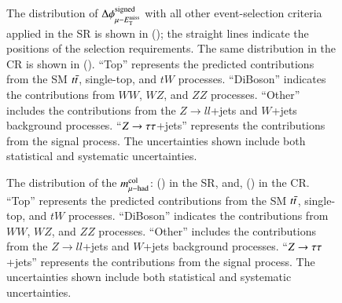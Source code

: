         \begin{figure}[htbp]
            \centering
            \caption{
                The distribution of $\Delta \phi_{\mu\mathrm{-}E_{\text{T}}^{\text{miss}}}^\mathrm{signed}$ with all other event-selection criteria 
                applied in the SR is shown in (\protect{}); 
                the straight lines indicate the positions of the selection requirements.
                The same distribution in the CR is shown in (\protect{}). 
                ``Top'' represents the predicted contributions from the SM $t\bar{t}$, single-top, and $tW$ processes. 
                ``DiBoson'' indicates the contributions from $WW$, $WZ$, and $ZZ$ processes. 
                ``Other'' includes the contributions from the $Z\rightarrow ll$+jets and $W$+jets background processes. 
                ``$Z \rightarrow \tau\tau$+jets'' represents the contributions from the signal process.
                The uncertainties shown include both statistical and systematic uncertainties.
            }
            \label{fig:murm:s_dphi}
        \end{figure}

        \begin{figure}[htbp]
            \centering
            \caption{
                The distribution of the $m_{\mu\mathrm{-}\mathrm{had}}^\mathrm{col}$: (\protect{}) in the SR, and,
                (\protect{}) in the CR. 
                ``Top'' represents the predicted contributions from the SM $t\bar{t}$, single-top, and $tW$ processes. 
                ``DiBoson'' indicates the contributions from $WW$, $WZ$, and $ZZ$ processes. 
                ``Other'' includes the contributions from the $Z\rightarrow ll$+jets and $W$+jets background processes. 
                ``$Z \rightarrow \tau\tau$+jets'' represents the contributions from the signal process.
                The uncertainties shown include both statistical and systematic uncertainties.
            }
            \label{fig:murm:m_col}
        \end{figure}

